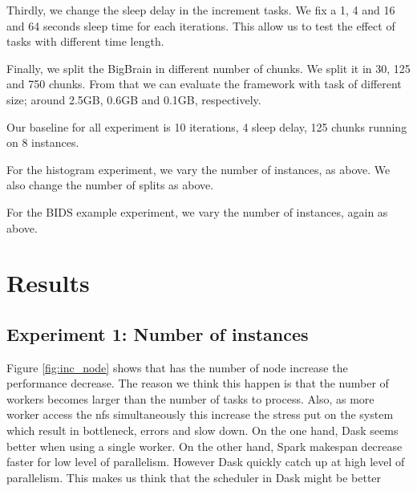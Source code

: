 \documentclass[11pt,a4paper]{article}
\begin{document}
Thirdly, we change the sleep delay in the increment tasks. We fix a 1, 4 and 16 and 64 seconds sleep time for each iterations. This allow us to test the effect of tasks with different time length.

Finally, we split the BigBrain in different number of chunks. We split it in 30, 125 and 750 chunks. From that we can evaluate the framework with task of different size; around 2.5GB, 0.6GB and 0.1GB, respectively.

Our baseline for all experiment is 10 iterations, 4 sleep delay, 125 chunks running on 8 instances.

For the histogram experiment, we vary the number of instances, as above. We also change the number of splits as above.  

For the BIDS example experiment, we vary the number of instances, again as above.



\section{Results}

\subsection{Experiment 1: Number of instances}
Figure \ref{fig:inc_node} shows that has the number of node increase the performance decrease. The reason we think this happen is that the number of workers becomes larger than the number of tasks to process. Also, as more worker access the nfs simultaneously this increase the stress put on the system which result in bottleneck, errors and slow down. On the one hand, Dask seems better when using a single worker. On the other hand, Spark makespan decrease faster for low level of parallelism. However Dask quickly catch up at high level of parallelism. This makes us think that the scheduler in Dask might be better
\end{document}
